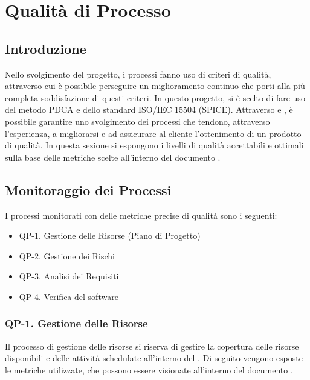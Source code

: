 \section{Qualità di Processo}

\subsection{Introduzione}

Nello svolgimento del progetto, i processi fanno uso di criteri di qualità, attraverso cui è possibile perseguire un miglioramento continuo che porti alla più completa soddisfazione di questi criteri. In questo progetto, si è scelto di fare uso del metodo PDCA e dello standard ISO/IEC 15504 (SPICE). Attraverso  e , è possibile garantire uno svolgimento dei processi che tendono, attraverso l'esperienza, a migliorarsi e ad assicurare al cliente l'ottenimento di un prodotto di qualità.
In questa sezione si espongono i livelli di qualità accettabili e ottimali sulla base delle metriche scelte all'interno del documento .

\subsection{Monitoraggio dei Processi}

I processi monitorati con delle metriche precise di qualità sono i seguenti:

\begin{itemize}
	\item QP-1. Gestione delle Risorse (Piano di Progetto)
	\item QP-2. Gestione dei Rischi
	\item QP-3. Analisi dei Requisiti
	\item QP-4. Verifica del software
\end{itemize}

	\subsubsection{QP-1. Gestione delle Risorse}

		Il processo di gestione delle risorse si riserva di gestire la copertura delle risorse disponibili e delle attività schedulate all'interno del . Di seguito vengono esposte le metriche utilizzate, che possono essere visionate all'interno del documento . 

